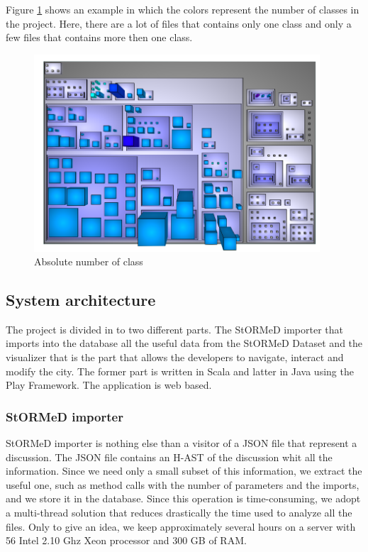 \documentclass[]{usiinfbachelorproject}
\newcommand {\stormed}[0]{StORMeD\xspace}
\begin{document}
Figure \ref{fig:classAbs} shows an example in which the colors represent the number of classes in the project. Here, there are a lot of files that contains only one class and only a few files that contains more then one class. 
	

 \begin{figure}[H]
	\centering
	\includegraphics[width=0.95\textwidth]{images/classAbs}
	\caption{Absolute number of class \label{fig:classAbs}}
 \end{figure}





\subsection{System architecture }
The project is divided in to two different parts. The \stormed importer that imports into the database all the useful data from the \stormed Dataset and the visualizer that is the part that allows the developers to navigate, interact and modify the city. The former part is written in Scala and latter in Java using the Play Framework. The application is web based. 




\subsubsection{\stormed importer}
\stormed importer is nothing else than a visitor of a JSON file that represent a discussion. The JSON file contains an H-AST of the discussion whit all the information. Since we need only a small subset of this information, we extract the useful one, such as method calls with the number of parameters and the imports, and we store it in the database. Since this operation is time-consuming, we adopt a multi-thread solution that reduces drastically the time used to analyze all the files. Only to give an idea, we keep approximately several hours on a server with 56 Intel 2.10 Ghz Xeon processor and 300 GB of RAM.
\end{document}
